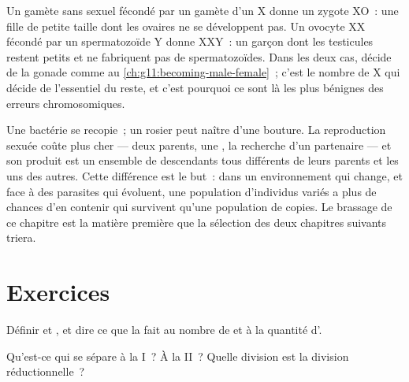 \begin{example}\label{ex:g12:meiosis-genetic-shuffling:sexchrom}
Un gamète sans  sexuel fécondé par un gamète  d'un X
donne un zygote XO~: une fille de petite taille dont les ovaires ne se
développent pas. Un ovocyte XX fécondé par un spermatozoïde Y donne
XXY~: un garçon dont les testicules restent petits et ne fabriquent pas
de spermatozoïdes. Dans les deux cas,  décide de la gonade comme au
\cref{ch:g11:becoming-male-female}~; c'est le nombre de  X
qui décide de l'essentiel du reste, et c'est pourquoi ce sont là les
plus bénignes des erreurs chromosomiques.
\end{example}

\begin{remark}\label{rem:g12:meiosis-genetic-shuffling:whysex}
Une bactérie se recopie~; un rosier peut naître d'une bouture. La
reproduction sexuée coûte plus cher --- deux parents, une , la
recherche d'un partenaire --- et son produit est un ensemble de
descendants tous différents de leurs parents et les uns des autres.
Cette différence est le but~: dans un environnement qui change, et face
à des parasites qui évoluent, une population d'individus variés a plus
de chances d'en contenir qui survivent qu'une population de copies. Le
brassage de ce chapitre est la matière première que la sélection des
deux chapitres suivants triera.
\end{remark}

\section{Exercices}

\begin{exercise}[$\star$]\label{exo:g12:meiosis-genetic-shuffling:1}
Définir  et , et dire ce que la  fait au nombre
de  et à la quantité d'.
\end{exercise}

\begin{exercise}[$\star$]\label{exo:g12:meiosis-genetic-shuffling:2}
Qu'est-ce qui se sépare à la  I~? À la  II~? Quelle
division est la division réductionnelle~?
\end{exercise}

